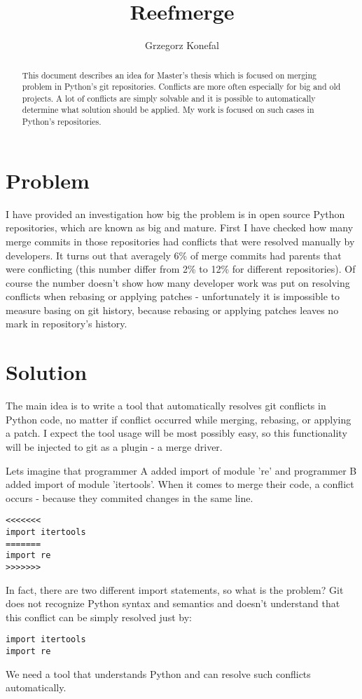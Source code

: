 \documentclass[a4paper,10pt]{article}
\title{Reefmerge}
\author{Grzegorz Konefal}
\begin{document}
\maketitle

\begin{abstract}

This document describes an idea for Master's thesis which is focused on merging problem in Python's git repositories.
Conflicts are more often especially for big and old projects.
A lot of conflicts are simply solvable and it is possible to automatically determine what solution should be applied.
My work is focused on such cases in Python's repositories.

\end{abstract}

\section*{Problem}

I have provided an investigation how big the problem is in open source Python repositories,
which are known as big and mature.
First I have checked how many merge commits in those repositories had conflicts that were resolved manually by developers.
It turns out that averagely 6\% of merge commits had parents that were conflicting
(this number differ from 2\% to 12\% for different repositories).
Of course the number doesn't show how many developer work was put on resolving conflicts
when rebasing or applying patches - unfortunately it is impossible to measure basing on git history,
because rebasing or applying patches leaves no mark in repository's history.

\section*{Solution}

The main idea is to write a tool that automatically resolves git conflicts in Python code,
no matter if conflict occurred while merging, rebasing, or applying a patch.
I expect the tool usage will be most possibly easy,
so this functionality will be injected to git as a plugin - a merge driver.

Lets imagine that programmer A added import of module 're' and programmer B added import of module 'itertools'.
When it comes to merge their code, a conflict occurs - because they commited changes in the same line.
\begin{lstlisting}
<<<<<<<
import itertools
=======
import re
>>>>>>>
\end{lstlisting}
In fact, there are two different import statements, so what is the problem?
Git does not recognize Python syntax and semantics and doesn't understand that this conflict
can be simply resolved just by:
\begin{lstlisting}
import itertools
import re
\end{lstlisting}
We need a tool that understands Python and can resolve such conflicts automatically.
\end{document}

